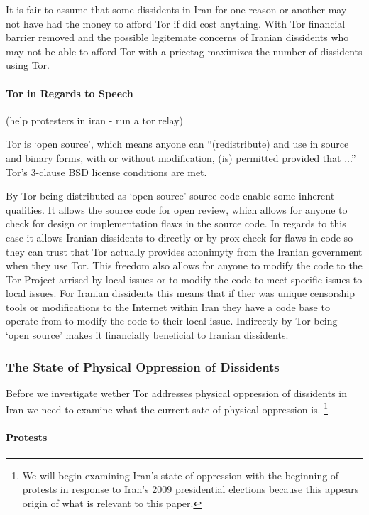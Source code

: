 \documentclass[11pt]{article}
\begin{document}
\begin{multicols}{2}
It is fair to assume that some dissidents in Iran for one reason or another may
not have had the money to afford Tor if did cost anything. With Tor financial
barrier removed and the possible legitemate concerns of Iranian dissidents who
may not be able to afford Tor with a pricetag maximizes the number of dissidents
using Tor.

\paragraph{Tor in Regards to Speech}
(help protesters in iran - run a tor relay)

Tor is `open source', which means anyone can ``(redistribute) and use in source and
binary forms, with or without modification, (is) permitted provided that ...'' 
Tor's 3-clause BSD license conditions are met. \cite{BSD:3-ClauseLicense,
TOR:Download, TOR:BSD-License} 

By Tor being distributed as `open source' source code enable some inherent
qualities. It allows the source code for open review, which allows for anyone to
check for design or implementation flaws in the source code. In regards to this
case it allows Iranian dissidents to directly or by prox check for flaws in code
so they can trust that Tor actually provides anonimyty from the Iranian
government when they use Tor. This freedom also allows for anyone to modify the
code to the Tor Project arrised by local issues or to modify the code to meet
specific issues to local issues. For Iranian dissidents this means that if ther
was unique censorship tools or modifications to the Internet within Iran they
have a code base to operate from to modify the code to their local issue.
Indirectly by Tor being `open source' makes it financially beneficial to Iranian
dissidents.

\subsubsection{The State of Physical Oppression of Dissidents}
Before we investigate wether Tor addresses physical oppression of dissidents in
Iran we need to examine what the current sate of physical oppression is.
\footnote{We will begin examining Iran's state of oppression with the beginning
of protests in response to Iran's 2009 presidential elections because this
appears origin of what is relevant to this paper.}

\paragraph{Protests}



\end{multicols}
\end{document}
